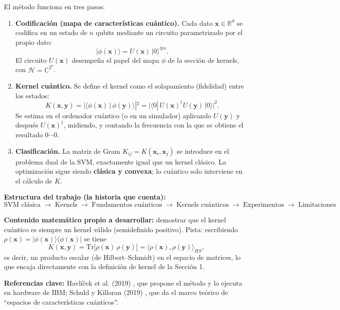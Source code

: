\documentclass[12pt, a4paper]{article}
\begin{document}
\noindent El método funciona en tres pasos:
\begin{enumerate}
    \item \textbf{Codificación (mapa de características cuántico).} Cada dato $\mathbf{x} \in \mathbb{R}^d$ se codifica en un estado de $n$ qubits mediante un circuito parametrizado por el propio dato:
    \[ |\phi(\mathbf{x})\rangle = U(\mathbf{x})\,|0\rangle^{\otimes n}. \]
    El circuito $U(\mathbf{x})$ desempeña el papel del mapa $\phi$ de la sección de kernels, con $\mathcal{H} = \mathbb{C}^{2^n}$.

    \item \textbf{Kernel cuántico.} Se define el kernel como el solapamiento (fidelidad) entre los estados:
    \[ K(\mathbf{x}, \mathbf{y}) = |\langle \phi(\mathbf{x}) \,|\, \phi(\mathbf{y}) \rangle|^2 = \big|\langle 0 |\, U(\mathbf{x})^\dagger U(\mathbf{y}) \,| 0 \rangle\big|^2. \]
    Se estima en el ordenador cuántico (o en un simulador) aplicando $U(\mathbf{y})$ y después $U(\mathbf{x})^\dagger$, midiendo, y contando la frecuencia con la que se obtiene el resultado $0\cdots0$.

    \item \textbf{Clasificación.} La matriz de Gram $K_{ij} = K(\mathbf{x}_i, \mathbf{x}_j)$ se introduce en el problema dual de la SVM, exactamente igual que un kernel clásico. La optimización sigue siendo \textbf{clásica y convexa}; lo cuántico solo interviene en el cálculo de $K$.
\end{enumerate}

\noindent \textbf{Estructura del trabajo (la historia que cuenta):}
\[
\text{SVM clásica} \;\rightarrow\; \text{Kernels} \;\rightarrow\; \text{Fundamentos cuánticos} \;\rightarrow\; \text{Kernels cuánticos} \;\rightarrow\; \text{Experimentos} \;\rightarrow\; \text{Limitaciones}
\]

\noindent \textbf{Contenido matemático propio a desarrollar:} demostrar que el kernel cuántico es siempre un kernel válido (semidefinido positivo). Pista: escribiendo $\rho(\mathbf{x}) = |\phi(\mathbf{x})\rangle\langle\phi(\mathbf{x})|$ se tiene
\[ K(\mathbf{x}, \mathbf{y}) = \mathrm{Tr}\big[\rho(\mathbf{x})\,\rho(\mathbf{y})\big] = \langle \rho(\mathbf{x}), \rho(\mathbf{y}) \rangle_{HS}, \]
es decir, un producto escalar (de Hilbert--Schmidt) en el espacio de matrices, lo que encaja directamente con la definición de kernel de la Sección 1.

\noindent \textbf{Referencias clave:} Havlíček et al. (2019) \cite{havlicek2019supervised}, que propone el método y lo ejecuta en hardware de IBM; Schuld y Killoran (2019) \cite{schuld2019quantum}, que da el marco teórico de ``espacios de características cuánticos''.
\end{document}
